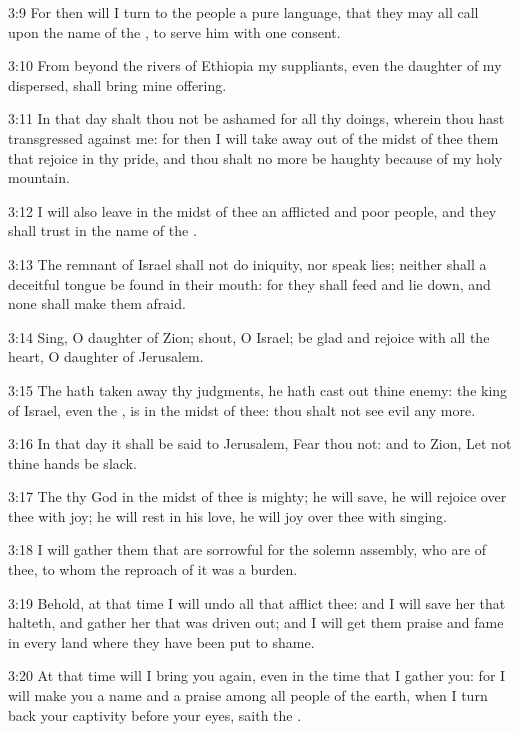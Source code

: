 3:9 For then will I turn to the people a pure language, that they may all call upon the name of the \LORD, to serve him with one consent.

3:10 From beyond the rivers of Ethiopia my suppliants, even the daughter of my dispersed, shall bring mine offering.

3:11 In that day shalt thou not be ashamed for all thy doings, wherein thou hast transgressed against me: for then I will take away out of the midst of thee them that rejoice in thy pride, and thou shalt no more be haughty because of my holy mountain.

3:12 I will also leave in the midst of thee an afflicted and poor people, and they shall trust in the name of the \LORD.

3:13 The remnant of Israel shall not do iniquity, nor speak lies; neither shall a deceitful tongue be found in their mouth: for they shall feed and lie down, and none shall make them afraid.

3:14 Sing, O daughter of Zion; shout, O Israel; be glad and rejoice with all the heart, O daughter of Jerusalem.

3:15 The \LORD hath taken away thy judgments, he hath cast out thine enemy: the king of Israel, even the \LORD, is in the midst of thee: thou shalt not see evil any more.

3:16 In that day it shall be said to Jerusalem, Fear thou not: and to Zion, Let not thine hands be slack.

3:17 The \LORD thy God in the midst of thee is mighty; he will save, he will rejoice over thee with joy; he will rest in his love, he will joy over thee with singing.

3:18 I will gather them that are sorrowful for the solemn assembly, who are of thee, to whom the reproach of it was a burden.

3:19 Behold, at that time I will undo all that afflict thee: and I will save her that halteth, and gather her that was driven out; and I will get them praise and fame in every land where they have been put to shame.

3:20 At that time will I bring you again, even in the time that I gather you: for I will make you a name and a praise among all people of the earth, when I turn back your captivity before your eyes, saith the \LORD.

